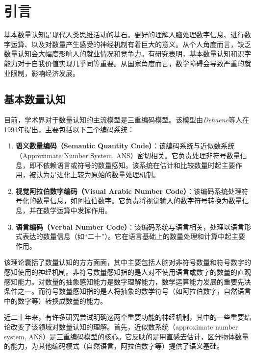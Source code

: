 \documentclass[bachelor, comfort]{shtthesis}
\begin{document}
\makeindices

\clearpage
\pagestyle{MNNumberedWithLogo}


\chapter{引言} %
\label{chap:intro}

基本数量认知是现代人类思维活动的基石。更好的理解人脑处理数字信息、进行数字运算、以及对数量产生感受的神经机制有着巨大的意义。从个人角度而言，缺乏数量认知会大幅度影响人的就业情况和竞争力。有研究表明，基本数量认知和识字能力对于自我价值实现几乎同等重要\cite{num9}。从国家角度而言，数学障碍会导致严重的就业限制，影响经济发展\cite{num10}。

\section{基本数量认知}
目前，学术界对于数量认知的主流模型是三重编码模型\cite{num7}。该模型由\emph{Dehaene}等人在1993年提出\cite{tcm1}，主要包括以下三个编码系统：
\begin{enumerate}
	\item \textbf{语义数量编码（Semantic Quantity Code）}：该编码系统与近似数系统（Approximate Number System, ANS）密切相关。它负责处理非符号数量信息，即不依赖语言或符号的数量感知。该系统在估计和比较数量时起主要作用，被认为是进化上较为原始的数量处理机制。
	\item \textbf{视觉阿拉伯数字编码（Visual Arabic Number Code）}：该编码系统处理符号化的数量信息，如阿拉伯数字。它负责将视觉输入的数字符号转换为数量信息，并在数学运算中发挥作用。
	\item \textbf{语言编码（Verbal Number Code）}：该编码系统与语言相关，处理以语言形式表达的数量信息（如“二十”）。它在语言基础上的数量处理和计算中起主要作用。
\end{enumerate}

该理论囊括了数量认知的方方面面，其中主要包括人脑对非符号数量和符号数字的感知使用的神经机制。非符号数量感知指的是人对不使用语言或数字的数量的直观感知能力。对数量的抽象感知能力是数字理解能力，数学运算能力发展的重要先决条件之一\cite{num11}。而符号数量感知指的是人将抽象的数学符号（如阿拉伯数字，自然语言中的数字等）转换成数量的能力。

近二十年来，有许多研究尝试明确这两个重要功能的神经机制，其中的一些重要结论改变了该领域对数量认知的理解。首先，近似数系统（approximate number system, ANS）是三重编码模型的核心\cite{num7}。它反映的是用直感去估计，区分物体数量的能力，为其他编码模式（自然语言，阿拉伯数字等）提供了语义基础。
\end{document}
